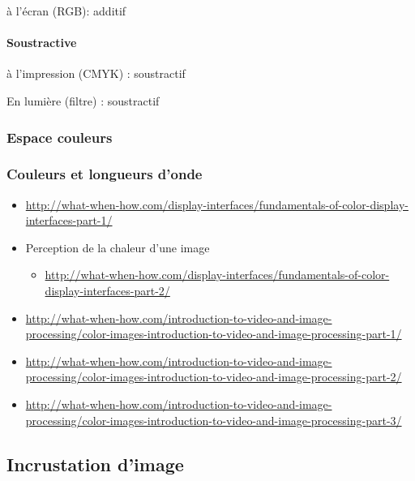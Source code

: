 \documentclass[
  french,
]{book}
\providecommand{\tightlist}{%
  \setlength{\itemsep}{0pt}\setlength{\parskip}{0pt}}
\begin{document}
à l'écran (RGB): additif

\hypertarget{soustractive}{%
\paragraph{Soustractive}\label{soustractive}}

à l'impression (CMYK) : soustractif

En lumière (filtre) : soustractif

\hypertarget{espace-couleurs}{%
\subsubsection{Espace couleurs}\label{espace-couleurs}}

\hypertarget{couleurs-et-longueurs-donde}{%
\subsubsection{Couleurs et longueurs d'onde}\label{couleurs-et-longueurs-donde}}

\begin{itemize}
\tightlist
\item
  \url{http://what-when-how.com/display-interfaces/fundamentals-of-color-display-interfaces-part-1/}
\item
  Perception de la chaleur d'une image

  \begin{itemize}
  \tightlist
  \item
    \url{http://what-when-how.com/display-interfaces/fundamentals-of-color-display-interfaces-part-2/}
  \end{itemize}
\item
  \url{http://what-when-how.com/introduction-to-video-and-image-processing/color-images-introduction-to-video-and-image-processing-part-1/}
\item
  \url{http://what-when-how.com/introduction-to-video-and-image-processing/color-images-introduction-to-video-and-image-processing-part-2/}
\item
  \url{http://what-when-how.com/introduction-to-video-and-image-processing/color-images-introduction-to-video-and-image-processing-part-3/}
\end{itemize}

\hypertarget{incrustation-dimage}{%
\subsection{Incrustation d'image}\label{incrustation-dimage}}
\end{document}
